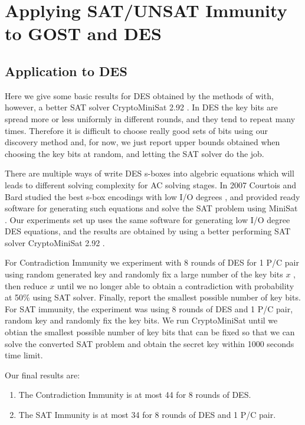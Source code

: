 \section{Applying SAT/UNSAT Immunity to GOST and DES}

\subsection{Application to DES}
Here we give some basic results for DES obtained by the methods of \cite{DEScourtois}
with, however, a better SAT solver CryptoMiniSat 2.92 \cite{CryptoMiniSat}. In DES the key bits are spread more or less uniformly in different rounds, and they tend to repeat many times. Therefore it is difficult to choose really good sets of bits using our discovery method and, for now, we just report upper bounds obtained when choosing
the key bits at random, and letting the SAT solver do the job. 

There are multiple ways of write DES s-boxes into algebric equations which will leads to different solving complexity for AC solving stages. In 2007 Courtois and Bard studied the best s-box encodings with low I/O degrees \cite{courtois2007algebraicDES}, and provided ready software for generating such equations and solve the SAT problem using MiniSat \cite{minisat}. Our experiments set up uses the same software for generating low I/O degree DES equations, and the results are obtained by using a better performing SAT solver CryptoMiniSat 2.92 \cite{CryptoMiniSat}.

For Contradiction Immunity we experiment with 8 rounds of DES for 1 P/C pair using random generated key and randomly fix a large number of the key bits $x$ , then reduce $x$ until we no longer able to obtain a contradiction with probability at 50\% using SAT solver. Finally, report the smallest possible number of key bits. For SAT immunity, the experiment was using 8 rounds of DES and 1 P/C pair, random key and randomly fix the key bits. We run CryptoMiniSat until we obtian the smallest possible number of key bits that can be fixed so that we can solve the converted SAT problem and obtain the secret key within 1000 seconds time limit.

Our final results are:
\begin{enumerate}
	\item The Contradiction Immunity
	is at most 44 for 8 rounds of DES.
	\item
	The SAT Immunity
	is at most 34 for 8 rounds of DES and 1 P/C pair.
\end{enumerate}

